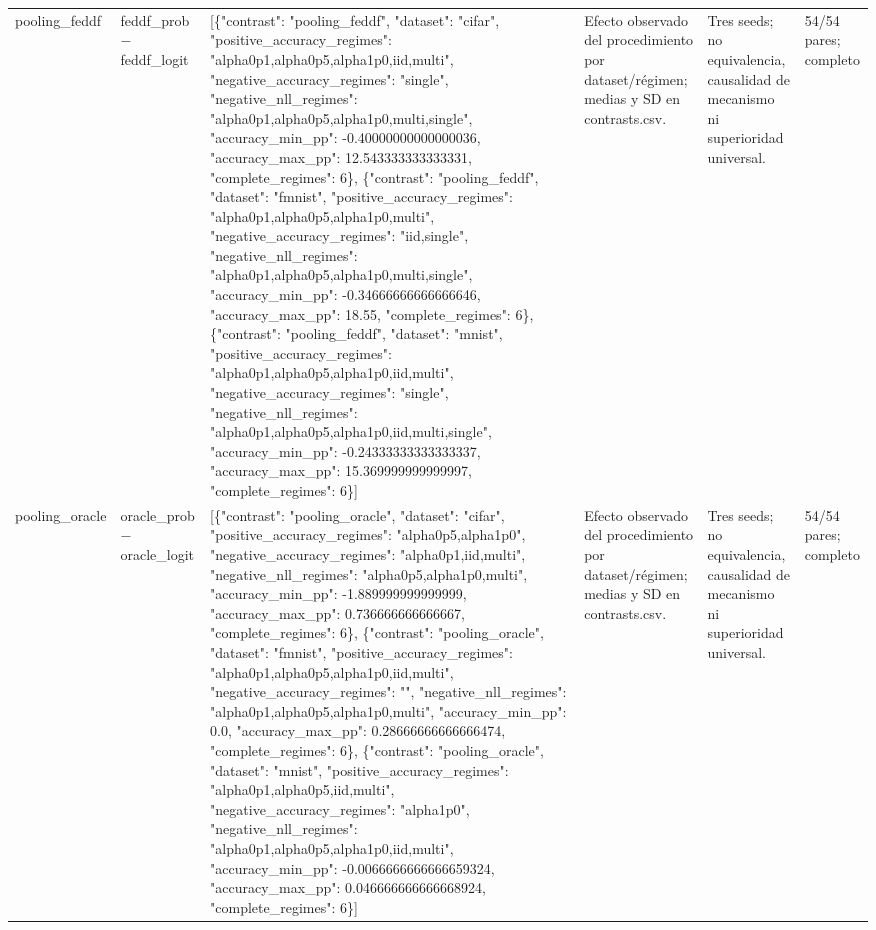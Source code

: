\begin{tabular}{llllll}
pooling\_feddf & feddf\_prob − feddf\_logit & [\{"contrast": "pooling\_feddf", "dataset": "cifar", "positive\_accuracy\_regimes": "alpha0p1,alpha0p5,alpha1p0,iid,multi", "negative\_accuracy\_regimes": "single", "negative\_nll\_regimes": "alpha0p1,alpha0p5,alpha1p0,multi,single", "accuracy\_min\_pp": -0.40000000000000036, "accuracy\_max\_pp": 12.543333333333331, "complete\_regimes": 6\}, \{"contrast": "pooling\_feddf", "dataset": "fmnist", "positive\_accuracy\_regimes": "alpha0p1,alpha0p5,alpha1p0,multi", "negative\_accuracy\_regimes": "iid,single", "negative\_nll\_regimes": "alpha0p1,alpha0p5,alpha1p0,multi,single", "accuracy\_min\_pp": -0.34666666666666646, "accuracy\_max\_pp": 18.55, "complete\_regimes": 6\}, \{"contrast": "pooling\_feddf", "dataset": "mnist", "positive\_accuracy\_regimes": "alpha0p1,alpha0p5,alpha1p0,iid,multi", "negative\_accuracy\_regimes": "single", "negative\_nll\_regimes": "alpha0p1,alpha0p5,alpha1p0,iid,multi,single", "accuracy\_min\_pp": -0.24333333333333337, "accuracy\_max\_pp": 15.369999999999997, "complete\_regimes": 6\}] & Efecto observado del procedimiento por dataset/régimen; medias y SD en contrasts.csv. & Tres seeds; no equivalencia, causalidad de mecanismo ni superioridad universal. & 54/54 pares; completo \\
pooling\_oracle & oracle\_prob − oracle\_logit & [\{"contrast": "pooling\_oracle", "dataset": "cifar", "positive\_accuracy\_regimes": "alpha0p5,alpha1p0", "negative\_accuracy\_regimes": "alpha0p1,iid,multi", "negative\_nll\_regimes": "alpha0p5,alpha1p0,multi", "accuracy\_min\_pp": -1.889999999999999, "accuracy\_max\_pp": 0.736666666666667, "complete\_regimes": 6\}, \{"contrast": "pooling\_oracle", "dataset": "fmnist", "positive\_accuracy\_regimes": "alpha0p1,alpha0p5,alpha1p0,iid,multi", "negative\_accuracy\_regimes": "", "negative\_nll\_regimes": "alpha0p1,alpha0p5,alpha1p0,multi", "accuracy\_min\_pp": 0.0, "accuracy\_max\_pp": 0.28666666666666474, "complete\_regimes": 6\}, \{"contrast": "pooling\_oracle", "dataset": "mnist", "positive\_accuracy\_regimes": "alpha0p1,alpha0p5,iid,multi", "negative\_accuracy\_regimes": "alpha1p0", "negative\_nll\_regimes": "alpha0p1,alpha0p5,alpha1p0,iid,multi", "accuracy\_min\_pp": -0.0066666666666659324, "accuracy\_max\_pp": 0.046666666666668924, "complete\_regimes": 6\}] & Efecto observado del procedimiento por dataset/régimen; medias y SD en contrasts.csv. & Tres seeds; no equivalencia, causalidad de mecanismo ni superioridad universal. & 54/54 pares; completo \\

\end{tabular}
